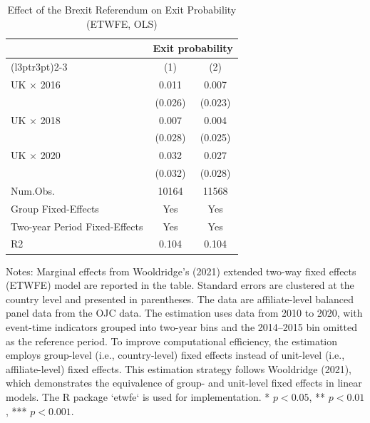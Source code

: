 \begin{table}[!ht]
\centering
\caption{\label{tab:Table-ETWFE-OLS}Effect of the Brexit Referendum on Exit Probability (ETWFE, OLS)}
\centering
\begin{tabular}[t]{lcc}
\toprule
\multicolumn{1}{c}{ } & \multicolumn{2}{c}{Exit probability} \\
\cmidrule(l{3pt}r{3pt}){2-3}
 & (1) & (2)\\
\midrule
UK $\times$ 2016 & 0.011 & 0.007\\
 & (0.026) & (0.023)\\
UK $\times$ 2018 & 0.007 & 0.004\\
 & (0.028) & (0.025)\\
UK $\times$ 2020 & 0.032 & 0.027\\
 & (0.032) & (0.028)\\
Num.Obs. & 10164 & 11568\\
Group Fixed-Effects & Yes & Yes\\
Two-year Period Fixed-Effects & Yes & Yes\\
R2 & 0.104 & 0.104\\
\bottomrule
\end{tabular}
\begin{flushleft}
\footnotesize
Notes: Marginal effects from Wooldridge's (2021) extended two-way fixed effects (ETWFE) model are reported in the table. Standard errors are clustered at the country level and presented in parentheses. The data are affiliate-level balanced panel data from the OJC data. The estimation uses data from 2010 to 2020, with event-time indicators grouped into two-year bins and the 2014--2015 bin omitted as the reference period. To improve computational efficiency, the estimation employs group-level (i.e., country-level) fixed effects instead of unit-level (i.e., affiliate-level) fixed effects. This estimation strategy follows Wooldridge (2021), which demonstrates the equivalence of group- and unit-level fixed effects in linear models. The R package `etwfe` is used for implementation. * $p<0.05$, ** $p<0.01$, *** $p<0.001$.
\end{flushleft}
\end{table}
